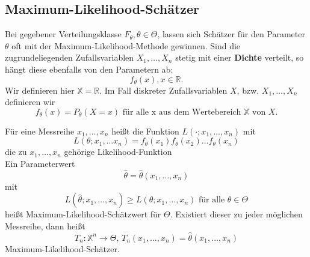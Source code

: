\documentclass[
	ngerman,
	accentcolor=9c,%
	type=intern,
	marginpar=false
	]{tudapub}
\begin{document}
        \subsection{Maximum-Likelihood-Schätzer}
            Bei gegebener Verteilungsklasse $F_\theta, \theta \in \Theta$,
            lassen sich Schätzer für den Parameter $\theta$ oft mit der Maximum-Likelihood-Methode gewinnen.
            Sind die zugrundeliegenden Zufallsvariablen $X_1,\dots , X_n$ stetig mit einer \textbf{Dichte} verteilt, so
            hängt diese ebenfalls von den Parametern ab:
            \begin{equation*}
                f_\theta(x), x \in \mathbb{R}.
            \end{equation*}
            Wir definieren hier $\mathbb{X} = \mathbb{R}$.
            Im Fall diskreter Zufallsvariablen $X$, bzw. $X_1,\dots, X_n$ definieren wir
            \begin{equation*}
                f_\theta(x) = P_\theta(X = x) \text{ für alle x aus dem Wertebereich } \mathbb{X} \text{ von } X.
            \end{equation*}
            \begin{definition}
                Für eine Messreihe $x_1, \dots, x_n$ heißt die Funktion $L(\cdot;x_1,\dots,x_n)$ mit 
                \begin{equation*}
                    L(\theta; x_1, \dots x_n) = f_\theta(x_1)f_\theta(x_2)\dots f_\theta(x_n)
                \end{equation*}
                die zu $x_1, \dots, x_n$ gehörige Likelihood-Funktion\\

                Ein Parameterwert
                \begin{equation*}
                    \hat{\theta} = \hat{\theta}(x_1, \dots, x_n) 
                \end{equation*}
                mit 
                \begin{equation*}
                    L(\hat{\theta}; x_1,\dots,x_n) \geq L(\theta; x_1,\dots,x_n) \text{ für alle }\theta \in \Theta
                \end{equation*}
                heißt Maximum-Likelihood-Schätzwert für $\Theta$. Existiert dieser zu jeder möglichen Messreihe, dann heißt
                \begin{equation*}
                    T_n:\mathbb{X}^n\rightarrow \Theta \mbox{, }T_n(x_1,\dots,x_n) = \hat{\theta}(x_1, \dots, x_n)
                \end{equation*}
                Maximum-Likelihood-Schätzer.
            \end{definition}
\end{document}
